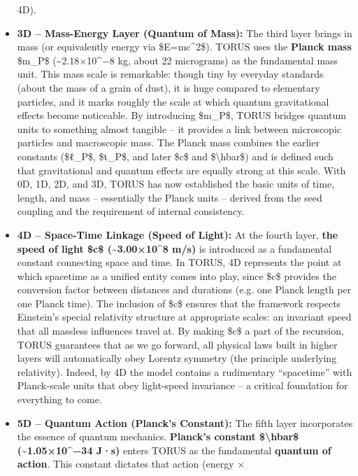 \documentclass[
]{article}
\begin{document}
\begin{itemize}
  4D).
\item
  \textbf{3D -- Mass-Energy Layer (Quantum of Mass):} The third layer
  brings in mass (or equivalently energy via \$E=mc\^{}2\$). TORUS uses
  the \textbf{Planck mass} \$m\_P\$ (\textasciitilde2.18×10\^{}−8 kg,
  about 22 micrograms) as the fundamental mass unit\hspace{0pt}. This
  mass scale is remarkable: though tiny by everyday standards (about the
  mass of a grain of dust), it is huge compared to elementary particles,
  and it marks roughly the scale at which quantum gravitational effects
  become noticeable. By introducing \$m\_P\$, TORUS bridges quantum
  units to something almost tangible -- it provides a link between
  microscopic particles and macroscopic mass. The Planck mass combines
  the earlier constants (\$ℓ\_P\$, \$t\_P\$, and later \$c\$ and
  \$\textbackslash hbar\$) and is defined such that gravitational and
  quantum effects are equally strong at this scale. With 0D, 1D, 2D, and
  3D, TORUS has now established the basic units of time, length, and
  mass -- essentially the Planck units -- derived from the seed coupling
  and the requirement of internal consistency.
\item
  \textbf{4D -- Space-Time Linkage (Speed of Light):} At the fourth
  layer, \textbf{the speed of light \$c\$ (\textasciitilde3.00×10\^{}8
  m/s)} is introduced as a fundamental constant connecting space and
  time\hspace{0pt}. In TORUS, 4D represents the point at which spacetime
  as a unified entity comes into play, since \$c\$ provides the
  conversion factor between distances and durations (e.g. one Planck
  length per one Planck time). The inclusion of \$c\$ ensures that the
  framework respects Einstein's special relativity structure at
  appropriate scales: an invariant speed that all massless influences
  travel at. By making \$c\$ a part of the recursion, TORUS guarantees
  that as we go forward, all physical laws built in higher layers will
  automatically obey Lorentz symmetry (the principle underlying
  relativity). Indeed, by 4D the model contains a rudimentary
  ``spacetime'' with Planck-scale units that obey light-speed invariance
  -- a critical foundation for everything to come.
\item
  \textbf{5D -- Quantum Action (Planck's Constant):} The fifth layer
  incorporates the essence of quantum mechanics. \textbf{Planck's
  constant \$\textbackslash hbar\$ (\textasciitilde1.05×10\^{}−34 J·s)}
  enters TORUS as the fundamental \textbf{quantum of
  action}\hspace{0pt}. This constant dictates that action (energy ×

\end{itemize}
\end{document}
